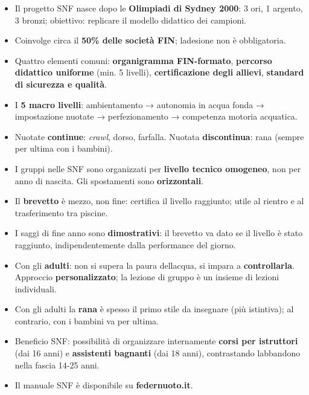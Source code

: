 \documentclass[a4paper,11pt]{article}
\providecommand{\tightlist}{%
  \setlength{\itemsep}{0pt}\setlength{\parskip}{0pt}}
\begin{document}
\begin{itemize}
      \tightlist
      \item
            Il progetto SNF nasce dopo le \textbf{Olimpiadi di Sydney 2000}: 3
            ori, 1 argento, 3 bronzi; obiettivo: replicare il modello didattico
            dei campioni.
      \item
            Coinvolge circa il \textbf{50\% delle società FIN};
            l\textquotesingle adesione non è obbligatoria.
      \item
            Quattro elementi comuni: \textbf{organigramma FIN-formato},
            \textbf{percorso didattico uniforme} (min. 5 livelli),
            \textbf{certificazione degli allievi}, \textbf{standard di sicurezza e
                  qualità}.
      \item
            I \textbf{5 macro livelli}: ambientamento → autonomia in acqua fonda →
            impostazione nuotate → perfezionamento → competenza motoria acquatica.
      \item
            Nuotate \textbf{continue}: \emph{crawl}, dorso, farfalla. Nuotata
            \textbf{discontinua}: rana (sempre per ultima con i bambini).
      \item
            I gruppi nelle SNF sono organizzati per \textbf{livello tecnico
                  omogeneo}, non per anno di nascita. Gli spostamenti sono
            \textbf{orizzontali}.
      \item
            Il \textbf{brevetto} è mezzo, non fine: certifica il livello
            raggiunto; utile al rientro e al trasferimento tra piscine.
      \item
            I saggi di fine anno sono \textbf{dimostrativi}: il brevetto va dato
            se il livello è stato raggiunto, indipendentemente dalla performance
            del giorno.
      \item
            Con gli \textbf{adulti}: non si supera la paura
            dell\textquotesingle acqua, si impara a \textbf{controllarla}.
            Approccio \textbf{personalizzato}; la lezione di gruppo è un insieme
            di lezioni individuali.
      \item
            Con gli adulti la \textbf{rana} è spesso il primo stile da insegnare
            (più istintiva); al contrario, con i bambini va per ultima.
      \item
            Beneficio SNF: possibilità di organizzare internamente \textbf{corsi
                  per istruttori} (dai 16 anni) e \textbf{assistenti bagnanti} (dai 18
            anni), contrastando l\textquotesingle abbandono nella fascia 14-25
            anni.
      \item
            Il manuale SNF è disponibile su \textbf{federnuoto.it}.
\end{itemize}
\end{document}
